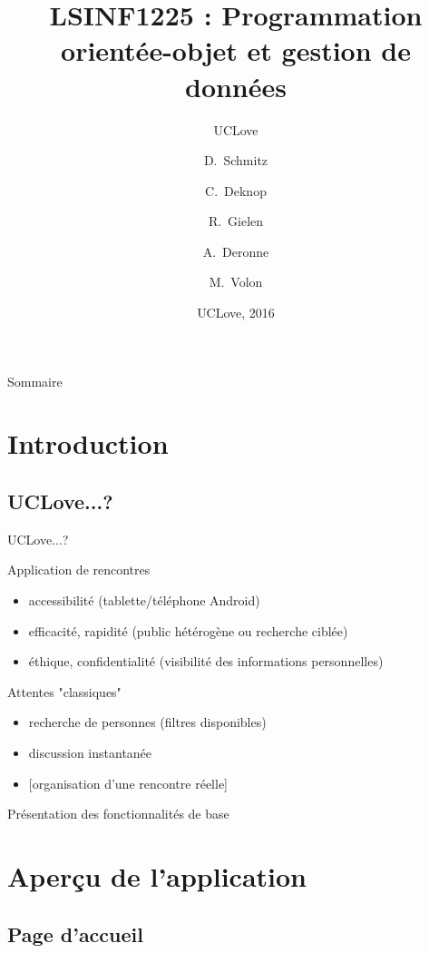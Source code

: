 \documentclass{beamer}
\title{LSINF1225 : Programmation orientée-objet et gestion de données}
\subtitle{UCLove}
\author{D.~Schmitz\inst{1} \and C.~Deknop\inst{2} \and R.~Gielen\inst{3} \and A.~Deronne\inst{4} \and M.~Volon\inst{5}}
\institute[Université de Louvain-la-Neuve] %
{
  \inst{1}%
  SINF11BA
  \and
  \inst{2}%
  SINF12BA
  \and
  \inst{3}%
  SINF12BA
  \and
  \inst{4}%
  SINF12BA
  \and
  \inst{5}%
  LING2MS/LA
  }
\date{UCLove, 2016}
\begin{document}
\begin{frame}
  \titlepage
\end{frame}

\begin{frame}{Sommaire}
  \tableofcontents
\end{frame}

\section{Introduction}

\subsection{UCLove...?}
\begin{frame}{UCLove...?}
\begin{block}{Application de rencontres}
	\begin{itemize}
		\item{
			accessibilité (tablette/téléphone Android)
		}
		\item{
			efficacité, rapidité (public hétérogène ou recherche ciblée)
		}
		\item{
			éthique, confidentialité (visibilité des informations personnelles)
		}
	\end{itemize}
\end{block}
\begin{block}{Attentes "classiques"}
	\begin{itemize}
		\item{
			recherche de personnes (filtres disponibles)
		}
		\item{
			discussion instantanée
		}
		\item{
			[organisation d'une rencontre réelle]
		}
	\end{itemize}
\end{block}
\begin{block}{Présentation des fonctionnalités de base}
\end{block}
\end{frame}


\section{Aperçu de l'application}

\subsection*{Page d'accueil}
\end{document}
